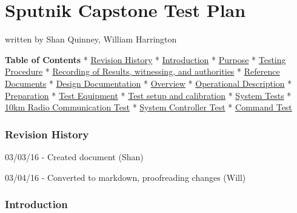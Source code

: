 \documentclass[]{article}
\date{}
\begin{document}
\section{Sputnik Capstone Test Plan}\label{sputnik-capstone-test-plan}

written by Shan Quinney, William Harrington

\textbf{Table of Contents} *
\href{https://github.com/wrh2/sputnik/wiki/Phase-1-Test-Plan\#revision-history}{Revision
History} *
\href{https://github.com/wrh2/sputnik/wiki/Phase-1-Test-Plan\#introduction}{Introduction}
*
\href{https://github.com/wrh2/sputnik/wiki/Phase-1-Test-Plan\#purpose}{Purpose}
*
\href{https://github.com/wrh2/sputnik/wiki/Phase-1-Test-Plan\#testing-procedure}{Testing
Procedure} *
\href{https://github.com/wrh2/sputnik/wiki/Phase-1-Test-Plan\#recording-of-results-witnessing-and-authorities}{Recording
of Results, witnessing, and authorities} *
\href{https://github.com/wrh2/sputnik/wiki/Phase-1-Test-Plan\#reference-documents}{Reference
Documents} *
\href{https://github.com/wrh2/sputnik/wiki/Phase-1-Test-Plan\#design-documentation}{Design
Documentation} *
\href{https://github.com/wrh2/sputnik/wiki/Phase-1-Test-Plan\#overview}{Overview}
*
\href{https://github.com/wrh2/sputnik/wiki/Phase-1-Test-Plan\#operational-description}{Operational
Description} *
\href{https://github.com/wrh2/sputnik/wiki/Phase-1-Test-Plan\#preparation}{Preparation}
*
\href{https://github.com/wrh2/sputnik/wiki/Phase-1-Test-Plan\#test-equipment}{Test
Equipment} *
\href{https://github.com/wrh2/sputnik/wiki/Phase-1-Test-Plan\#test-setup-and-calibration}{Test
setup and calibration} *
\href{https://github.com/wrh2/sputnik/wiki/Phase-1-Test-Plan\#system-tests}{System
Tests} *
\href{https://github.com/wrh2/sputnik/wiki/Phase-1-Test-Plan\#10km-radio-communication-test}{10km
Radio Communication Test} *
\href{https://github.com/wrh2/sputnik/wiki/Phase-1-Test-Plan\#system-controller-test}{System
Controller Test} *
\href{https://github.com/wrh2/sputnik/wiki/Phase-1-Test-Plan\#command-test}{Command
Test}

\subsubsection{Revision History}\label{revision-history}

03/03/16 - Created document (Shan)

03/04/16 - Converted to markdown, proofreading changes (Will)

\subsubsection{Introduction}\label{introduction}
\end{document}
